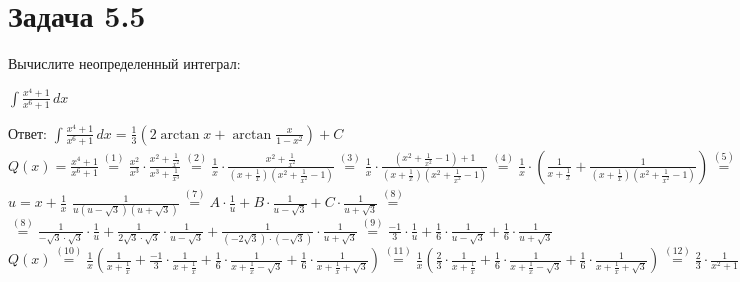 


	\section{Задача 5.5}
	Вычислите неопределенный интеграл:
	\newline
	\begin{center}
		$\int{\frac{x^4+1}{x^6+1}\, dx} $
	\end{center}
	Ответ: 	$\int{\frac{x^4+1}{x^6+1}\, dx} = \frac{1}{3} (2 \arctan x +   \arctan \frac{x}{1-x^2}) + C$
	\newline
	$Q(x) = \frac{x^4+1}{x^6+1} \stackrel{(1)}{=}\frac{x^2}{x^3} \cdot \frac{x^2+\frac{1}{x^2}}{x^3+\frac{1}{x^3}} \stackrel{(2)}{=}  
	\frac{1}{x}\cdot \frac{x^2+\frac{1}{x^2}}{(x+\frac{1}{x})(x^2+\frac{1}{x^2}-1)} \stackrel{(3)}{=} 
	\frac{1}{x}\cdot \frac{(x^2+\frac{1}{x^2}-1)+1}{(x+\frac{1}{x})(x^2+\frac{1}{x^2}-1)} \stackrel{(4)}{=} 
	\frac{1}{x}\cdot (\frac{1}{x+\frac{1}{x}} + \frac{1}{(x+\frac{1}{x})(x^2+\frac{1}{x^2}-1)}) \stackrel{(5)}{=} 
	\frac{1}{x}\cdot (\frac{1}{x+\frac{1}{x}} + \frac{1}{(x+\frac{1}{x})((x+\frac{1}{x})^2-3)}) \stackrel{(6)}{=} 
	\frac{1}{x}\cdot (\frac{1}{x+\frac{1}{x}} + \frac{1}{(x+\frac{1}{x})(x+\frac{1}{x}-\sqrt{3})(x+\frac{1}{x}+\sqrt{3})})$
	\newline
	$u = x+\frac{1}{x}$
	\newline
	$\frac{1}{u(u-\sqrt{3})(u+\sqrt{3})} \stackrel{(7)}{=} A\cdot \frac{1}{u} + B\cdot \frac{1}{u-\sqrt{3}} + C\cdot \frac{1}{u+\sqrt{3}} \stackrel{(8)}{=}$
	\newline
	$\stackrel{(8)}{=}\frac{1}{-\sqrt{3} \cdot \sqrt{3}}\cdot \frac{1}{u} + \frac{1}{2 \sqrt{3}\cdot \sqrt{3}}\cdot \frac{1}{u-\sqrt{3}} + \frac{1}{(-2 \sqrt{3})\cdot (-\sqrt{3})}\cdot \frac{1}{u+\sqrt{3}}\stackrel{(9)}{=} 
	\frac{-1}{3}\cdot \frac{1}{u} + \frac{1}{6}\cdot \frac{1}{u-\sqrt{3}} + \frac{1}{6}\cdot \frac{1}{u+\sqrt{3}}$
	\newline
	$Q(x) \stackrel{(10)}{=} \frac{1}{x} (\frac{1}{x+\frac{1}{x}} + \frac{-1}{3}\cdot \frac{1}{x+\frac{1}{x}} + \frac{1}{6}\cdot \frac{1}{x+\frac{1}{x}-\sqrt{3}} + \frac{1}{6}\cdot \frac{1}{x+\frac{1}{x}+\sqrt{3}}) \stackrel{(11)}{=} \frac{1}{x} (\frac{2}{3}\cdot \frac{1}{x+\frac{1}{x}} + \frac{1}{6}\cdot \frac{1}{x+\frac{1}{x}-\sqrt{3}} + \frac{1}{6}\cdot \frac{1}{x+\frac{1}{x}+\sqrt{3}})\stackrel{(12)}{=} \frac{2}{3}\cdot \frac{1}{x^2+1} + \frac{1}{6}\cdot \frac{1}{x^2-\sqrt{3}x+1} + \frac{1}{6}\cdot \frac{1}{x^2+\sqrt{3}x+1} \stackrel{(13)}{=} \frac{2}{3}\cdot \frac{1}{x^2+1} + \frac{1}{6}\cdot \frac{1}{(x-\frac{\sqrt{3}}{2})^2+(\frac{1}{2})^2} + \frac{1}{6}\cdot \frac{1}{(x+\frac{\sqrt{3}}{2})^2+(\frac{1}{2})^2}$
